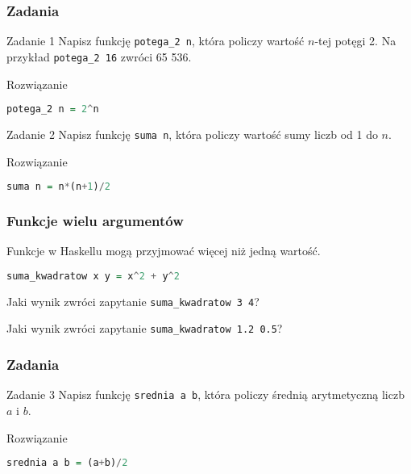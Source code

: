 \begin{frame}[fragile]
  \frametitle{Zadania}
    \begin{block}{Zadanie 1}
    Napisz funkcję \texttt{potega\_2 n}, która policzy wartość $n$-tej
    potęgi 2. Na przykład \texttt{potega\_2 16} zwróci 65 536.
  \end{block}
  \vspace{1em}
  \pause

  \begin{block}{Rozwiązanie}
    \begin{lstlisting}[language=Haskell]
potega_2 n = 2^n
    \end{lstlisting}
  \end{block}
  \pause

  \begin{block}{Zadanie 2}
    Napisz funkcję \texttt{suma n}, która policzy wartość sumy liczb od 1 do $n$.
  \end{block}
  \vspace{1em}
  \pause

  \begin{block}{Rozwiązanie}
    \begin{lstlisting}[language=Haskell]
suma n = n*(n+1)/2
    \end{lstlisting}
  \end{block}

\end{frame}

\begin{frame}[fragile]
  \frametitle{Funkcje wielu argumentów}
  Funkcje w Haskellu mogą przyjmować więcej niż jedną wartość.
  \vspace{1em}

  \begin{lstlisting}[language=Haskell]
suma_kwadratow x y = x^2 + y^2
  \end{lstlisting}
  \vspace{1em}
  \pause

  Jaki wynik zwróci zapytanie \texttt{suma\_kwadratow 3 4}?
  \vspace{1em}
  \pause

  Jaki wynik zwróci zapytanie \texttt{suma\_kwadratow 1.2 0.5}?

\end{frame}

\begin{frame}[fragile]
  \frametitle{Zadania}
  \begin{block}{Zadanie 3}
    Napisz funkcję \texttt{srednia a b}, która policzy średnią arytmetyczną
    liczb $a$ i $b$.
  \end{block}
  \vspace{1em}
  \pause

  \begin{block}{Rozwiązanie}
    \begin{lstlisting}[language=Haskell]
srednia a b = (a+b)/2
    \end{lstlisting}
  \end{block}
\end{frame}

